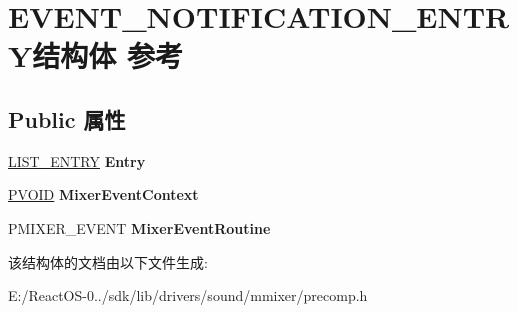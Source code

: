 \hypertarget{struct_e_v_e_n_t___n_o_t_i_f_i_c_a_t_i_o_n___e_n_t_r_y}{}\section{E\+V\+E\+N\+T\+\_\+\+N\+O\+T\+I\+F\+I\+C\+A\+T\+I\+O\+N\+\_\+\+E\+N\+T\+R\+Y结构体 参考}
\label{struct_e_v_e_n_t___n_o_t_i_f_i_c_a_t_i_o_n___e_n_t_r_y}
\subsection*{Public 属性}
\begin{DoxyCompactItemize}
\item 
\mbox{\label{struct_e_v_e_n_t___n_o_t_i_f_i_c_a_t_i_o_n___e_n_t_r_y_a7d8f275e7e1d6d84d6613cabdb9f53e8}} 
\hyperlink{struct___l_i_s_t___e_n_t_r_y}{L\+I\+S\+T\+\_\+\+E\+N\+T\+RY} {\bfseries Entry}
\item 
\mbox{\label{struct_e_v_e_n_t___n_o_t_i_f_i_c_a_t_i_o_n___e_n_t_r_y_a0c442d343526e708573a58915532fe63}} 
\hyperlink{interfacevoid}{P\+V\+O\+ID} {\bfseries Mixer\+Event\+Context}
\item 
\mbox{\label{struct_e_v_e_n_t___n_o_t_i_f_i_c_a_t_i_o_n___e_n_t_r_y_aecec0b594a68a2bcfd85bbc9e08b0f96}} 
P\+M\+I\+X\+E\+R\+\_\+\+E\+V\+E\+NT {\bfseries Mixer\+Event\+Routine}
\end{DoxyCompactItemize}


该结构体的文档由以下文件生成\+:\begin{DoxyCompactItemize}
\item 
E\+:/\+React\+O\+S-\/0../sdk/lib/drivers/sound/mmixer/precomp.\+h\end{DoxyCompactItemize}

